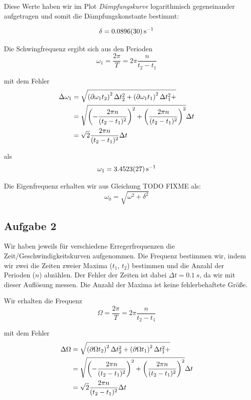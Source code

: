 \documentclass[a4paper,german,12pt,smallheadings]{scrartcl}
\begin{document}
Diese Werte haben wir im Plot \textit{Dämpfungskurve} logarithmisch
gegeneinander aufgetragen und somit die Dämpfungskonstante bestimmt:

\begin{equation}
  \delta = \SI{0.0896+-0.0030}{s^{-1}}
\end{equation}

Die Schwingfrequenz ergibt sich aus den Perioden
\begin{equation}
  \omega_1 = \frac{2 \pi}{T} = 2 \pi \frac{n}{t_2 - t_1}
\end{equation}

mit dem Fehler
\begin{align}
  \Delta \omega_1 &= \sqrt{
    \del{\partial{\omega_1}{t_2}}^2 \Delta t_2^2 +
    \del{\partial{\omega_1}{t_1}}^2 \Delta t_1^2 +
  } \\
  &= \sqrt{
    \del{-\frac{2 \pi n}{(t_2 - t_1)^2}}^2 +
    \del{\frac{2 \pi n}{(t_2 - t_1)^2}}^2
  } \Delta t \\
  &= \sqrt{2} \frac{2 \pi n}{(t_2 - t_1)^2} \Delta t
\end{align}

als
\begin{equation}
  \omega_1 = \SI{3.4523+-0.0027}{s^{-1}}
\end{equation}

Die Eigenfrequenz erhalten wir aus Gleichung TODO FIXME als: %
\begin{equation}
  \omega_0 = \sqrt{\omega^2  + \delta^2}
\end{equation}



\subsection{Aufgabe 2}
Wir haben jeweils für verschiedene Erregerfrequenzen die
Zeit/Geschwindigkeitskurven aufgenommen. Die Frequenz bestimmen wir, indem wir
zwei die Zeiten zweier Maxima ($t_1$, $t_2$) bestimmen und die Anzahl der
Perioden ($n$) abzählen. Der Fehler der Zeiten ist dabei $\Delta t =
\SI{0.1}{s}$, da wir mit dieser Auflösung messen. Die Anzahl der Maxima ist
keine fehlerbehaftete Größe.

Wir erhalten die Frequenz
\begin{equation}
  \Omega = \frac{2 \pi}{T} = 2 \pi \frac{n}{t_2 - t_1}
\end{equation}

mit dem Fehler
\begin{align}
  \Delta \Omega &= \sqrt{
    \del{\partial{\Omega}{t_2}}^2 \Delta t_2^2 +
    \del{\partial{\Omega}{t_1}}^2 \Delta t_1^2 +
  } \\
  &= \sqrt{
    \del{-\frac{2 \pi n}{(t_2 - t_1)^2}}^2 +
    \del{\frac{2 \pi n}{(t_2 - t_1)^2}}^2
  } \Delta t \\
  &= \sqrt{2} \frac{2 \pi n}{(t_2 - t_1)^2} \Delta t
\end{align}
\end{document}
